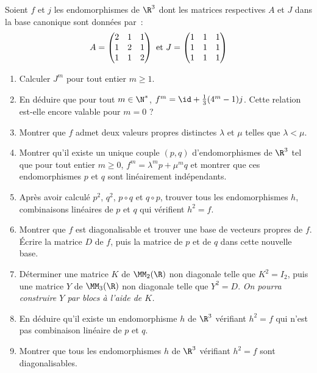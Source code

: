 \documentclass[twoside,french,11pt]{VcCours}
\begin{document}
 Soient $f$ et $j$ les endomorphismes de $\R^3$ dont les matrices respectives $A$ et $J$ dans la base canonique sont données par~:
$$
A=
\begin{pmatrix}
2 & 1 & 1 \\
1 & 2 & 1 \\
1 & 1 & 2
\end{pmatrix}
\ \hbox{et} \ 
J=
\begin{pmatrix}
1 & 1 & 1 \\
1 & 1 & 1 \\
1 & 1 & 1 \\
\end{pmatrix}
$$
\begin{enumerate}
\item Calculer $J^m$ pour tout entier $m \ge 1$.
\item En déduire que pour tout $m \in \N^*$, $f^m=\id + \frac13 (4^m-1) j$. Cette relation est-elle encore valable pour $m=0$ ?
\item Montrer que $f$ admet deux valeurs propres distinctes $\lambda$ et $\mu$ telles que $\lambda<\mu$.
\item Montrer qu'il existe un unique couple $(p,q)$ d'endomorphismes de $\R^3$ tel que pour tout entier $m \ge 0$, $f^m=\lambda^m p + \mu^m q$ et montrer que ces endomorphismes $p$ et $q$ sont linéairement indépendants.
\item Après avoir calculé $p^2$, $q^2$, $p \circ q$ et $q \circ p$, trouver tous les endomorphismes $h$, combinaisons linéaires de $p$ et $q$ qui vérifient $h^2=f$.
\item Montrer que $f$ est diagonalisable et trouver une base de vecteurs propres de $f$. Écrire la matrice $D$ de $f$, puis la matrice de $p$ et de $q$ dans cette nouvelle base.
\item Déterminer une matrice $K$ de $\MM_2(\R)$ non diagonale telle que $K^2=I_2$, puis une matrice $Y$ de $\MM_3(\R)$ non diagonale telle que $Y^2=D$. \textit{On pourra construire $Y$ par blocs à l'aide de $K$.}
\item En déduire qu'il existe un endomorphisme $h$ de $\R^3$ vérifiant $h^2=f$ qui n'est pas combinaison linéaire de $p$ et $q$.
\item Montrer que tous les endomorphismes $h$ de $\R^3$ vérifiant $h^2=f$ sont diagonalisables.
\end{enumerate}
\end{document}
